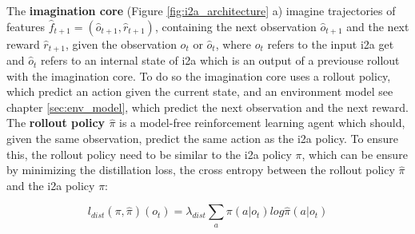 
The \textbf{imagination core} (Figure \ref{fig:i2a_architecture} a) imagine trajectories of features $\hat{f}_{t+1} = (\hat{o}_{t+1}, \hat{r}_{t+1})$, containing the next observation $\hat{o}_{t+1}$ and the next reward $\hat{r}_{t+1}$, given the observation $o_t$ or $\hat{o}_{t}$, where $o_t$ refers to the  input i2a get and $\hat{o}_{t}$ refers to an internal state of i2a which is an output of a previouse rollout with the imagination core.
To do so the imagination core uses a rollout policy, which predict an action given the current state, and an environment model see chapter \ref{sec:env_model}, which predict the next observation and the next reward.\\




The \textbf{rollout policy $\hat{\pi}$} is a model-free reinforcement learning agent which should, given the same observation, predict the same action as the i2a policy. To ensure this, the rollout policy need to be similar to the i2a policy $\pi$, which can be ensure by minimizing the distillation loss, the cross entropy between the rollout policy $\hat{\pi}$ and the i2a policy $\pi$:

 
\begin{equation} 
    l_{dist}(\pi, \hat{\pi})(o_t) = \lambda_{dist} \sum_a \pi(a | o_t) log \hat{\pi}(a|o_t) 
\end{equation} 

